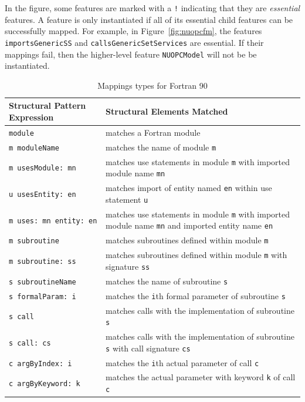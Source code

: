 \documentclass[oneside,11pt]{memoir}
\begin{document}
In the figure, some features are marked with a \texttt{!} indicating that they are \emph{essential} features. A feature is only instantiated if all of its essential child features can be successfully mapped. For example, in Figure~\ref{fig:nuopcfm}, the features \texttt{importsGenericSS} and \texttt{callsGenericSetServices} are essential. If their mappings fail, then the higher-level feature \texttt{NUOPCModel} will not be be instantiated.

{
\footnotesize
\begin{table}
\caption{Mappings types for Fortran 90}
\label{tab:mappings}
\begin{center}
    \begin{tabular}{| l | p{8cm} |}
		\hline
    \textbf{Structural Pattern Expression} & \textbf{Structural Elements Matched} \\ \hline
		\texttt{module} & matches a Fortran module \\ \hline
		\texttt{m moduleName} & matches the name of module \texttt{m} \\ \hline
		\texttt{m usesModule: mn} & matches use statements in module \texttt{m} with imported module name \texttt{mn} \\ \hline
		\texttt{u usesEntity: en} & matches import of entity named \texttt{en} within use statement \texttt{u} \\ \hline
		\texttt{m uses: mn entity: en} & matches use statements in module \texttt{m} with imported module name \texttt{mn} and imported entity name \texttt{en} \\ \hline
		\texttt{m subroutine} & matches subroutines defined within module \texttt{m} \\ \hline
		\texttt{m subroutine: ss} & matches subroutines defined within module \texttt{m} with signature \texttt{ss} \\ \hline
		\texttt{s subroutineName} & matches the name of subroutine \texttt{s} \\ \hline
		\texttt{s formalParam: i} & matches the \texttt{i}th formal parameter of subroutine \texttt{s} \\ \hline
		\texttt{s call} & matches calls with the implementation of subroutine \texttt{s} \\ \hline
		\texttt{s call: cs} & matches calls with the implementation of subroutine \texttt{s} with call signature \texttt{cs}\\ \hline
		\texttt{c argByIndex: i} & matches the \texttt{i}th actual parameter of call \texttt{c} \\ \hline
		\texttt{c argByKeyword: k} & matches the actual parameter with keyword \texttt{k} of call \texttt{c} \\ \hline
    \end{tabular}
\end{center}
\end{table}
}
\end{document}
